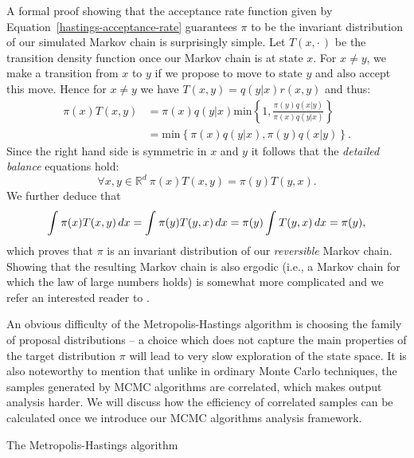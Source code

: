 \documentclass[report.tex]{subfiles}
\begin{document}
A formal proof showing that the acceptance rate function given by
Equation~\ref{hastings-acceptance-rate} guarantees $\pi$ to be the invariant distribution
of our simulated Markov chain is surprisingly simple. Let $T(x,\cdot\,)$ be the
transition density function once our Markov chain is at state $x$.
For $x \neq y$, we make a transition from $x$ to $y$ if we propose to move
to state $y$ and also accept this move.
Hence for $x \neq y$ we have $T(x,y) = q(y \vert x) r(x, y)$ and thus:
\begin{equation*}
\begin{split}
  \pi(x)T(x,y)
  &= \pi(x)q(y \vert x)
     \text{min}\left\{1, \frac{\pi(y)q(x \vert y)}{\pi(x)q(y \vert x)} \right\} \\
  &= \text{min}\left\{ \pi(x)q(y \vert x), \pi(y)q(x \vert y) \right\}.
\end{split}
\end{equation*}
Since the right hand side is symmetric in $x$ and $y$
it follows that the \textit{detailed balance} equations hold:
\begin{equation*}
  \forall x, y \in \mathbb{R}^{d}\  \pi(x)T(x, y) = \pi(y)T(y, x).
\end{equation*}
We further deduce that
\begin{equation*}
    \int_{{}}^{{}} {\pi(x)T(x, y)}\, d{x}
  = \int_{{}}^{{}} {\pi(y)T(y, x)}\, d{x}
  = \pi(y) \int_{{}}^{{}} {T(y, x)}\, d{x}
  = \pi(y),
\end{equation*}
which proves that $\pi$ is an invariant distribution of our
\textit{reversible} Markov chain. Showing that the resulting Markov chain is
also ergodic (i.e., a Markov chain for which the law of large numbers holds)
is somewhat more complicated and we refer an interested reader
to \citet[Chapter 6]{robert2005monte}.

An obvious difficulty of the Metropolis-Hastings algorithm is choosing the
family of proposal distributions -- a choice which does not capture the main
properties of the target distribution $\pi$ will lead to very slow
exploration of the state space.
It is also noteworthy to mention that unlike in ordinary Monte Carlo techniques,
the samples generated by MCMC algorithms are correlated, which makes output
analysis harder. We will discuss how the efficiency of correlated samples can be
calculated once we introduce our MCMC algorithms analysis framework.

\begin{algorithm}
\caption{The Metropolis-Hastings algorithm}
\label{alg-metropolis-hastings}
\begin{algorithmic}
  \For{$i = 1, 2, \dots$}
    \State{$\text{Generate}\ U \sim \text{Uniform}(0, 1)$}
      \State{$x_{i} \gets y$}
    \Else
    \EndIf
  \EndFor
\end{algorithmic}
\end{algorithm}
\end{document}
